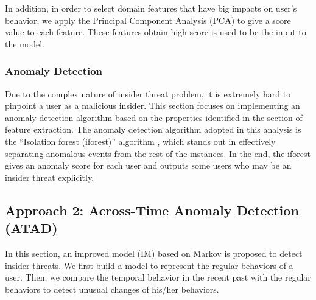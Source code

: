 \documentclass[conference]{IEEEtran}
\begin{document}

In addition, in order to select domain features that have big impacts on user's behavior, we apply the Principal Component Analysis (PCA) \cite{b19} to give a score value to each feature. These features obtain high score is used to be the input to the model. 
\subsubsection{Anomaly Detection}

Due to the complex nature of insider threat problem, it is extremely hard to pinpoint a user as a malicious insider. This section focuses on implementing an anomaly detection algorithm based on the properties identified in the section of feature extraction. The anomaly detection algorithm adopted in this analysis is the ``Isolation forest (iforest)'' algorithm \cite{b20}, which stands out in effectively separating anomalous events from the rest of the instances. In the end, the iforest gives an anomaly score for each user and outputs some users who may be an insider threat explicitly.

\subsection{Approach 2: Across-Time Anomaly Detection (ATAD)}

In this section, an improved model (IM) based on Markov is proposed to detect insider threats. We first build a model to represent the regular behaviors of a user. Then, we compare the temporal behavior in the recent past with the regular behaviors to detect unusual changes of his/her behaviors.
 

\end{document}
